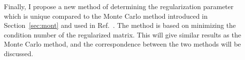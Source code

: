 Finally, I propose a new method of determining the regularization
parameter which is unique compared to the Monte Carlo method
introduced in Section~\ref{sec:mont} and used in Ref.~\cite{bea}.  The
method is based on minimizing the condition number of the regularized
matrix.  This will give similar results as the Monte Carlo method, and
the correspondence between the two methods will be discussed.




 



